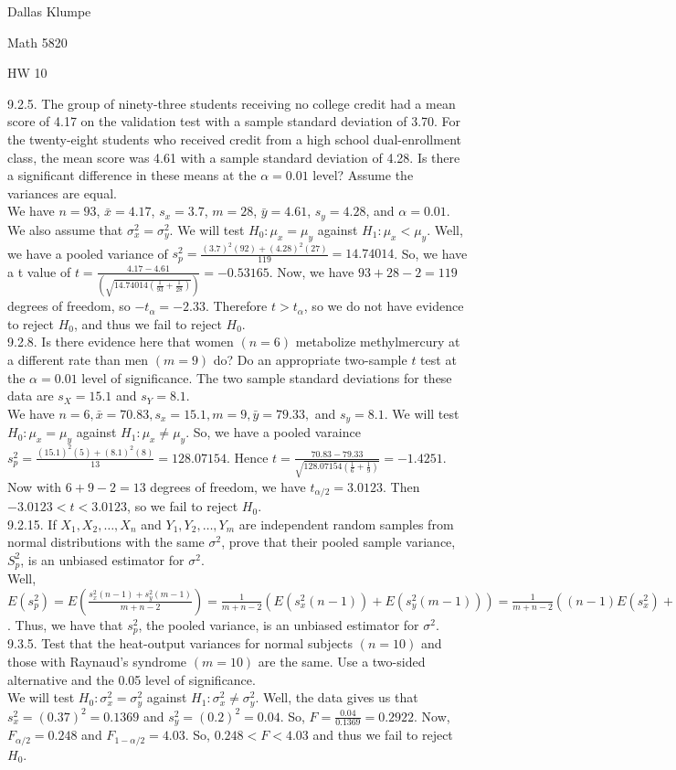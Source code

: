 \documentclass[12pt]{article}
\begin{document}
\noindent Dallas Klumpe

\noindent Math 5820

\noindent HW 10

9.2.5. The group of ninety-three students receiving no college credit had a mean score of 4.17 on the validation test with a sample standard deviation of 3.70. For the twenty-eight students who received credit from a high school dual-enrollment class, the mean score was 4.61 with a sample standard deviation of 4.28. Is there a significant difference in these means at the $\alpha=0.01$ level? Assume the variances are equal.\\
We have $n=93$, $\bar{x}=4.17$, $s_x=3.7$, $m=28$, $\bar{y}=4.61$, $s_y=4.28$, and $\alpha=0.01$. We also assume that $\sigma_x^2=\sigma_y^2$. We will test $H_0:\mu_x=\mu_y$ against $H_1:\mu_x<\mu_y$. Well, we have a pooled variance of $s_p^2=\frac{(3.7)^2(92)+(4.28)^2(27)}{119}=14.74014$. So, we have a t value of $t=\frac{4.17-4.61}{(\sqrt{14.74014(\frac{1}{93}+\frac{1}{28})})}=-0.53165$. Now, we have $93+28-2=119$ degrees of freedom, so $-t_{\alpha}=-2.33$. Therefore $t>t_{\alpha}$, so we do not have evidence to reject $H_0$, and thus we fail to reject $H_0$.\\[20pt]

9.2.8. Is there evidence here that women $(n=6)$ metabolize methylmercury at a different rate than men $(m=9)$ do? Do an appropriate two-sample $t$ test at the $\alpha=0.01$ level of significance. The two sample standard deviations for these data are $s_X=15.1$ and $s_Y=8.1$.\\
We have $n=6, \bar{x}=70.83, s_x=15.1, m=9, \bar{y}=79.33,$ and $s_y=8.1$. We will test $H_0:\mu_x=\mu_y$ against $H_1:\mu_x\neq\mu_y$. So, we have a pooled varaince $s_p^2=\frac{(15.1)^2(5)+(8.1)^2(8)}{13}=128.07154$. Hence $t=\frac{70.83-79.33}{\sqrt{128.07154(\frac{1}{6}+\frac{1}{9})}}=-1.4251$. Now with $6+9-2=13$ degrees of freedom, we have $t_{\alpha/2}=3.0123$. Then $-3.0123<t<3.0123$, so we fail to reject $H_0$.\\[20pt]

9.2.15. If $X_1, X_2,\ldots, X_n$ and $Y_1, Y_2,\ldots,Y_m$ are independent random samples from normal distributions with the same $\sigma^2$, prove that their pooled sample variance, $S_p^2$, is an unbiased estimator for $\sigma^2$.\\
Well, $E(s_p^2)=E(\frac{s_x^2(n-1)+s_y^2(m-1)}{m+n-2})=\frac{1}{m+n-2}(E(s_x^2(n-1))+E(s_y^2(m-1)))=\frac{1}{m+n-2}((n-1)E(s_x^2)+(m-1)E(s_y^2))=\frac{1}{m+n-2}((n-1)\sigma^2+(m-1)\sigma^2)=\frac{1}{m+n-2}((m+n-2)\sigma^2)=\sigma^2$. Thus, we have that $s_p^2$, the pooled variance, is an unbiased estimator for $\sigma^2$.\\[20pt]

9.3.5. Test that the heat-output variances for normal subjects $(n=10)$ and those with Raynaud’s syndrome $(m=10)$ are the same. Use a two-sided alternative and the 0.05 level of significance.\\
We will test $H_0:\sigma_x^2=\sigma_y^2$ against $H_1:\sigma_x^2\neq\sigma_y^2$. Well, the data gives us that $s_x^2=(0.37)^2=0.1369$ and $s_y^2=(0.2)^2=0.04$. So, $F=\frac{0.04}{0.1369}=0.2922$. Now, $F_{\alpha/2}=0.248$ and $F_{1-\alpha/2}=4.03$. So, $0.248<F<4.03$ and thus we fail to reject $H_0$.
\end{document}
